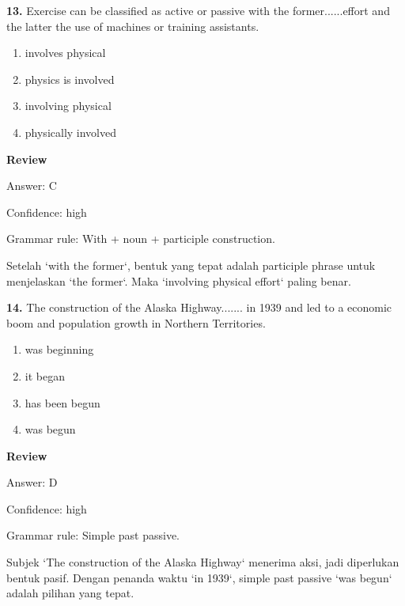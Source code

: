 \documentclass[12pt]{article}
\begin{document}
\endgroup
\par
\vspace{0.25\baselineskip}
\noindent\textbf{13.} Exercise can be classified as active or passive with the former......effort and the latter the use of machines or training assistants.
\begin{enumerate}[label=(\Alph*),leftmargin=*,itemsep=0.2em]
\item involves physical
\item physics is involved
\item involving physical
\item physically involved
\end{enumerate}
\par
\begingroup
\setlength{\parskip}{0pt}
\setlength{\parindent}{0pt}
\textbf{Review}\par
Answer: C\par
Confidence: high\par
Grammar rule: With + noun + participle construction.\par
Setelah `with the former`, bentuk yang tepat adalah participle phrase untuk menjelaskan `the former`. Maka `involving physical effort` paling benar.\par
\endgroup
\par
\vspace{0.25\baselineskip}
\noindent\textbf{14.} The construction of the Alaska Highway....... in 1939 and led to a economic boom and population growth in Northern Territories.
\begin{enumerate}[label=(\Alph*),leftmargin=*,itemsep=0.2em]
\item was beginning
\item it began
\item has been begun
\item was begun
\end{enumerate}
\par
\begingroup
\setlength{\parskip}{0pt}
\setlength{\parindent}{0pt}
\textbf{Review}\par
Answer: D\par
Confidence: high\par
Grammar rule: Simple past passive.\par
Subjek `The construction of the Alaska Highway` menerima aksi, jadi diperlukan bentuk pasif. Dengan penanda waktu `in 1939`, simple past passive `was begun` adalah pilihan yang tepat.\par
\endgroup
\par
\vspace{0.25\baselineskip}
\end{document}
